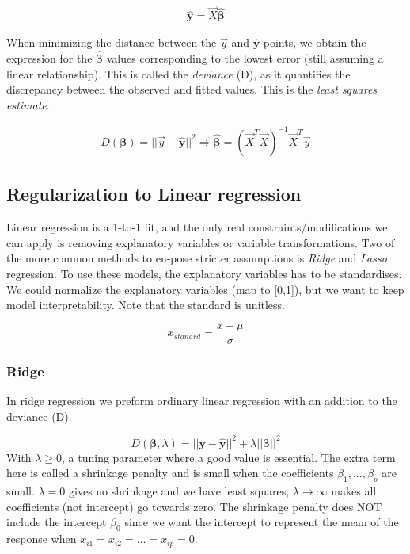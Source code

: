 \documentclass{article}
\renewcommand{\vec}[1]{\mathbf{#1}} %
\newcommand{\vecsym}[1]{\boldsymbol{#1}} %
\newcommand{\uvec}[1]{\mathbf{\hat{#1}}}
\begin{document}
\begin{align*}
    \uvec{y} = \Vec{X} \uvec{\beta}
\end{align*}

When minimizing the distance between the $\Vec{y}$ and $\uvec{y}$ points, we obtain the expression for the $\uvec{\beta}$ values corresponding to the lowest error (still assuming a linear relationship). This is called the \textit{deviance} (D), as it quantifies the discrepancy between the observed and fitted values. This is the \textit{least squares estimate}.

\begin{align*}
    D(\vecsym{\beta}) = ||\Vec{y}-\uvec{y}||^2 \Rightarrow \uvec{\beta} = (\Vec{X}^T \Vec{X})^{-1} \Vec{X}^T \Vec{y}
\end{align*}

\subsection{Regularization to Linear regression}
Linear regression is a 1-to-1 fit, and the only real constraints/modifications we can apply is removing explanatory variables or variable transformations. Two of the more common methods to en-pose stricter assumptions is \textit{Ridge} and \textit{Lasso} regression. To use these models, the explanatory variables has to be standardises. We could normalize the explanatory variables (map to [0,1]), but we want to keep model interpretability. Note that the standard is unitless.  

\begin{equation*}
    x_{stanard} = \frac{x-\mu}{\sigma}
\end{equation*}

\subsubsection{Ridge}
In ridge regression we preform ordinary linear regression with an addition to the deviance (D).  

\begin{equation*}
    D(\vecsym{\beta}, \lambda) = ||\vec{y} - \hat{\vec{y}}||^2 + \lambda ||\vecsym{\beta}||^2
\end{equation*}
With $\lambda \geq 0$, a tuning parameter where a good value is essential. The extra term here is called a shrinkage penalty and is small when the coefficients $\beta_1, ... , \beta_p$ are small. $\lambda = 0$ gives no shrinkage and we have least squares, $\lambda \rightarrow \infty$ makes all coefficients (not intercept) go towards zero. The shrinkage penalty does NOT include the intercept $\beta_0$ since we want the intercept to represent the mean of the response when $x_{i1} = x_{i2} = ... = x_{ip} = 0$.      
    
\end{document}
